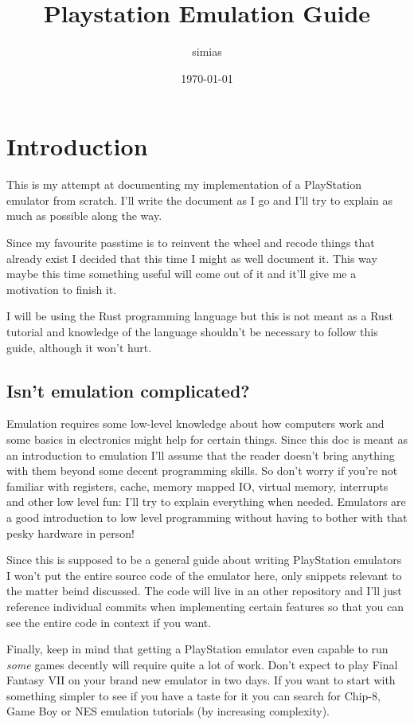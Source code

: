\documentclass{article}
\title{Playstation Emulation Guide}
\date{\today}
\author{simias}
\begin{document}
\maketitle
\newpage
\tableofcontents
\newpage

\section{Introduction}

This is my attempt at documenting my implementation of a PlayStation
emulator from scratch. I'll write the document as I go and I'll try to
explain as much as possible along the way.

Since my favourite passtime is to reinvent the wheel and recode things
that already exist I decided that this time I might as well document
it. This way maybe this time something useful will come out of it and
it'll give me a motivation to finish it.

I will be using the Rust programming language but this is not meant as
a Rust tutorial and knowledge of the language shouldn't be necessary
to follow this guide, although it won't hurt.

\subsection{Isn't emulation complicated?}

Emulation requires some low-level knowledge about how computers work
and some basics in electronics might help for certain things. Since
this doc is meant as an introduction to emulation I'll assume that the
reader doesn't bring anything with them beyond some decent programming
skills. So don't worry if you're not familiar with registers, cache,
memory mapped IO, virtual memory, interrupts and other low level fun:
I'll try to explain everything when needed. Emulators are a good
introduction to low level programming without having to bother with
that pesky hardware in person!

Since this is supposed to be a general guide about writing PlayStation
emulators I won't put the entire source code of the emulator here,
only snippets relevant to the matter beind discussed. The code will
live in an other repository and I'll just reference individual commits
when implementing certain features so that you can see the entire code
in context if you want.

Finally, keep in mind that getting a PlayStation emulator even capable
to run \emph{some} games decently will require quite a lot of work. Don't
expect to play Final Fantasy VII on your brand new emulator in two
days. If you want to start with something simpler to see if you have a
taste for it you can search for Chip-8, Game Boy or NES emulation
tutorials (by increasing complexity).
\end{document}
